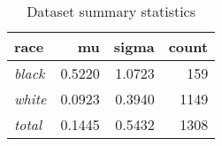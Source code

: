 \begin{wraptable}{r}{2in}

\caption{\label{tab:dataset_summary}Dataset summary statistics}
\centering
\fontsize{9}{11}\selectfont
\begin{tabular}[t]{>{}lrrr}
\toprule
race & mu & sigma & count\\
\midrule
\em{black} & 0.5220 & 1.0723 & 159\\
\em{white} & 0.0923 & 0.3940 & 1149\\
\em{total} & 0.1445 & 0.5432 & 1308\\
\bottomrule
\end{tabular}
\end{wraptable}
